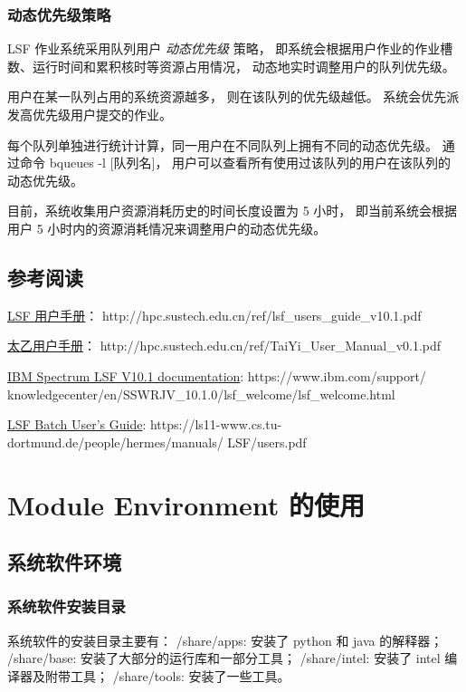 \documentclass[UTF8]{ctexart}
\newcommand{\myem}[1]{{\color{red}\em #1}}
\newcommand{\mynnote}[1]{\colorbox{gray!15}{\color{blue!65}#1}}
\begin{document}
\subsubsection{动态优先级策略}
LSF 作业系统采用队列用户 \myem{动态优先级} 策略，
即系统会根据用户作业的作业槽数、运行时间和累积核时等资源占用情况，
动态地实时调整用户的队列优先级。

用户在某一队列占用的系统资源越多，
则在该队列的优先级越低。
系统会优先派发高优先级用户提交的作业。

每个队列单独进行统计计算，同一用户在不同队列上拥有不同的动态优先级。
通过命令 \mynnote{bqueues -l [队列名]}，
用户可以查看所有使用过该队列的用户在该队列的动态优先级。

目前，系统收集用户资源消耗历史的时间长度设置为 5 小时，
即当前系统会根据用户 5 小时内的资源消耗情况来调整用户的动态优先级。

\subsection{参考阅读}
\href{http://hpc.sustech.edu.cn/ref/lsf_users_guide_v10.1.pdf}{LSF 用户手册}：
http://hpc.sustech.edu.cn/ref/lsf\_users\_guide\_v10.1.pdf

\href{http://hpc.sustech.edu.cn/ref/TaiYi_User_Manual_v0.1.pdf}{太乙用户手册}：
http://hpc.sustech.edu.cn/ref/TaiYi\_User\_Manual\_v0.1.pdf

\href{https://www.ibm.com/support/knowledgecenter/en/SSWRJV_10.1.0/lsf_welcome/lsf_welcome.html}{IBM Spectrum LSF V10.1 documentation}:
https://www.ibm.com/support/\newline
knowledgecenter/en/SSWRJV\_10.1.0/lsf\_welcome/lsf\_welcome.html

\href{https://ls11-www.cs.tu-dortmund.de/people/hermes/manuals/LSF/users.pdf}{LSF Batch User's Guide}:
https://ls11-www.cs.tu-dortmund.de/people/hermes/manuals/\newline
LSF/users.pdf

\section{Module Environment 的使用}
\subsection{系统软件环境}
\subsubsection{系统软件安装目录}
系统软件的安装目录主要有：\newline
/share/apps: 安装了 python 和 java 的解释器；\newline
/share/base: 安装了大部分的运行库和一部分工具；\newline
/share/intel: 安装了 intel 编译器及附带工具；\newline
/share/tools: 安装了一些工具。
\end{document}
